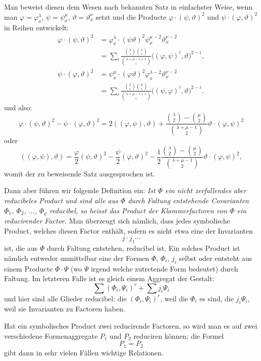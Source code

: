 \documentclass[10pt]{article}
\begin{document}
Man beweist diesen dem Wesen nach bekannten Satz in einfachster Weise, wenn man $\varphi=\varphi_x^\lambda$, $\psi=\psi_x^\mu$, $\vartheta=\vartheta_x^\nu$ setzt und die Producte $\varphi\cdot(\psi,\vartheta)^2$ und $\psi\cdot(\varphi,\vartheta)^2$ in Reihen entwickelt:
\[
\begin{aligned}
\varphi\cdot(\psi,\vartheta)^2
&=\varphi_x^\lambda\cdot(\psi\vartheta)^2\psi_x^{\mu-2}\vartheta_x^{\nu-2}\\
&=\sum_i\frac{\binom{2}{i}\binom{\lambda}{i}}{\binom{\lambda+\mu-i+1}{i}}\bigl((\varphi,\psi)^i,\vartheta\bigr)^{2-i},\\[0.25em]
\psi\cdot(\varphi,\vartheta)^2
&=\psi_x^\mu\cdot(\varphi\vartheta)^2\varphi_x^{\lambda-2}\vartheta_x^{\nu-2}\\
&=\sum_i\frac{\binom{2}{i}\binom{\mu}{i}}{\binom{\lambda+\mu-i+1}{i}}\bigl((\psi,\varphi)^i,\vartheta\bigr)^{2-i}.
\end{aligned}
\]
und also:
\[
\varphi\cdot(\psi,\vartheta)^2-\psi\cdot(\varphi,\vartheta)^2
=2((\varphi,\psi),\vartheta)+\frac{\binom{\lambda}{2}-\binom{\mu}{2}}{\binom{\lambda+\mu-1}{2}}\vartheta\cdot(\varphi,\psi)^2
\]
oder
\[
((\varphi,\psi),\vartheta)=\frac{\varphi}{2}(\psi,\vartheta)^2-\frac{\psi}{2}(\varphi,\vartheta)^2-\frac12\frac{\binom{\lambda}{2}-\binom{\mu}{2}}{\binom{\lambda+\mu-1}{2}}\vartheta\cdot(\varphi,\psi)^2,
\]
womit der zu beweisende Satz ausgesprochen ist.

Dann aber führen wir folgende Definition ein: \emph{Ist $\Phi$ ein nicht zerfallendes aber reducibeles Product und sind alle aus $\Phi$ durch Faltung entstehende Covarianten $\Phi_1$, $\Phi_2$, $\ldots$, $\Phi_\varrho$ reducibel, so heisst das Product der Klammerfactoren von $\Phi$ ein reducirender Factor.} Man überzeugt sich nämlich, dass jedes symbolische Product, welches diesen Factor enthält, sofern es nicht etwa eine der Invarianten
\[
j\cdot j_1\cdots
\]
ist, die aus $\Phi$ durch Faltung entstehen, reducibel ist. Ein solches Product ist nämlich entweder unmittelbar eine der Formen $\Phi$, $\Phi_i$, $j_i$ selbst oder entsteht aus einem Producte $\Phi\cdot\Psi$ (wo $\Psi$ irgend welche zutretende Form bedeutet) durch Faltung. Im letzteren Falle ist es gleich einem Aggregat der Gestalt:
\[
\sum(\Phi_i,\Psi_i)^r+\sum j_i\Psi_i
\]
und hier sind alle Glieder reducibel: die $(\Phi_i,\Psi_i)^r$, weil die $\Phi_i$ es sind, die $j_i\Psi_i$, weil sie Invarianten zu Factoren haben.

Hat ein symbolisches Product zwei reducirende Factoren, so wird man es auf zwei verschiedene Formenaggregate $P_1$ und $P_2$ reduciren können; die Formel
\[
P_1=P_2
\]
gibt dann in sehr vielen Fällen wichtige Relationen.
\end{document}
